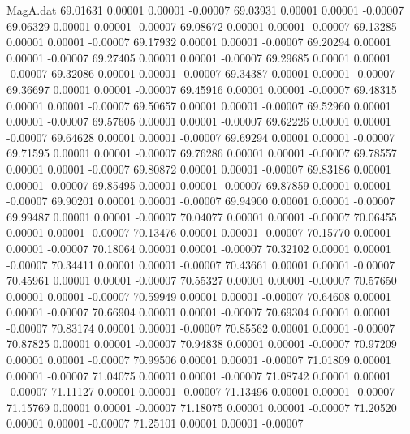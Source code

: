 \begin{filecontents}{MagA.dat}
  69.01631    0.00001    0.00001   -0.00007
  69.03931    0.00001    0.00001   -0.00007
  69.06329    0.00001    0.00001   -0.00007
  69.08672    0.00001    0.00001   -0.00007
  69.13285    0.00001    0.00001   -0.00007
  69.17932    0.00001    0.00001   -0.00007
  69.20294    0.00001    0.00001   -0.00007
  69.27405    0.00001    0.00001   -0.00007
  69.29685    0.00001    0.00001   -0.00007
  69.32086    0.00001    0.00001   -0.00007
  69.34387    0.00001    0.00001   -0.00007
  69.36697    0.00001    0.00001   -0.00007
  69.45916    0.00001    0.00001   -0.00007
  69.48315    0.00001    0.00001   -0.00007
  69.50657    0.00001    0.00001   -0.00007
  69.52960    0.00001    0.00001   -0.00007
  69.57605    0.00001    0.00001   -0.00007
  69.62226    0.00001    0.00001   -0.00007
  69.64628    0.00001    0.00001   -0.00007
  69.69294    0.00001    0.00001   -0.00007
  69.71595    0.00001    0.00001   -0.00007
  69.76286    0.00001    0.00001   -0.00007
  69.78557    0.00001    0.00001   -0.00007
  69.80872    0.00001    0.00001   -0.00007
  69.83186    0.00001    0.00001   -0.00007
  69.85495    0.00001    0.00001   -0.00007
  69.87859    0.00001    0.00001   -0.00007
  69.90201    0.00001    0.00001   -0.00007
  69.94900    0.00001    0.00001   -0.00007
  69.99487    0.00001    0.00001   -0.00007
  70.04077    0.00001    0.00001   -0.00007
  70.06455    0.00001    0.00001   -0.00007
  70.13476    0.00001    0.00001   -0.00007
  70.15770    0.00001    0.00001   -0.00007
  70.18064    0.00001    0.00001   -0.00007
  70.32102    0.00001    0.00001   -0.00007
  70.34411    0.00001    0.00001   -0.00007
  70.43661    0.00001    0.00001   -0.00007
  70.45961    0.00001    0.00001   -0.00007
  70.55327    0.00001    0.00001   -0.00007
  70.57650    0.00001    0.00001   -0.00007
  70.59949    0.00001    0.00001   -0.00007
  70.64608    0.00001    0.00001   -0.00007
  70.66904    0.00001    0.00001   -0.00007
  70.69304    0.00001    0.00001   -0.00007
  70.83174    0.00001    0.00001   -0.00007
  70.85562    0.00001    0.00001   -0.00007
  70.87825    0.00001    0.00001   -0.00007
  70.94838    0.00001    0.00001   -0.00007
  70.97209    0.00001    0.00001   -0.00007
  70.99506    0.00001    0.00001   -0.00007
  71.01809    0.00001    0.00001   -0.00007
  71.04075    0.00001    0.00001   -0.00007
  71.08742    0.00001    0.00001   -0.00007
  71.11127    0.00001    0.00001   -0.00007
  71.13496    0.00001    0.00001   -0.00007
  71.15769    0.00001    0.00001   -0.00007
  71.18075    0.00001    0.00001   -0.00007
  71.20520    0.00001    0.00001   -0.00007
  71.25101    0.00001    0.00001   -0.00007

\end{filecontents}

